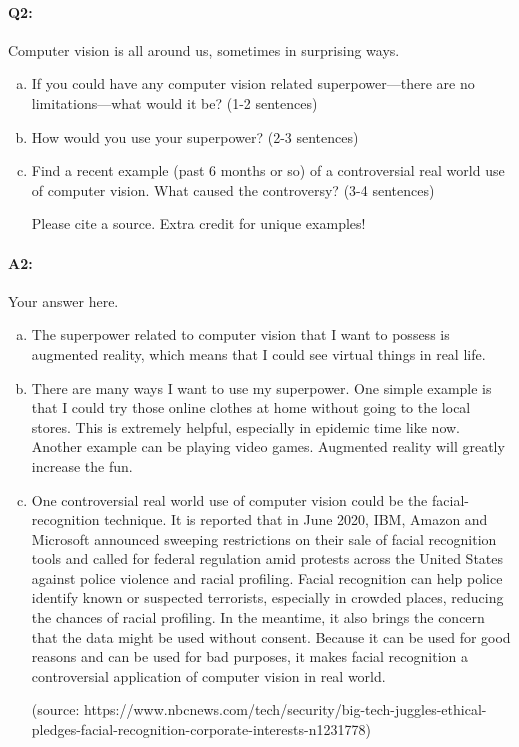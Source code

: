 \documentclass[11pt]{article}
\begin{document}
\paragraph{Q2:}
Computer vision is all around us, sometimes in surprising ways.
\begin{enumerate}[(a)]

\item
If you could have any computer vision related superpower---there are no limitations---what would it be? (1-2 sentences)

\item
How would you use your superpower? (2-3 sentences)

\item Find a recent example (past 6 months or so) of a controversial real world use of computer vision. What caused the controversy? (3-4 sentences)

Please cite a source. Extra credit for unique examples!
\end{enumerate}

\paragraph{A2:} Your answer here.

\begin{enumerate}[(a)]

\item The superpower related to computer vision that I want to possess is augmented reality, which means that I could see virtual things in real life.

\item There are many ways I want to use my superpower. One simple example is that I could try those online clothes at home without going to the local stores. This is extremely helpful, especially in epidemic time like now. Another example can be playing video games. Augmented reality will greatly increase the fun.

\item One controversial real world use of computer vision could be the facial-recognition technique. It is reported that in June 2020, IBM, Amazon and Microsoft announced sweeping restrictions on their sale of facial recognition tools and called for federal regulation amid protests across the United States against police violence and racial profiling. Facial recognition can help police identify known or suspected terrorists, especially in crowded places, reducing the chances of racial profiling. In the meantime, it also brings the concern that the data might be used without consent. Because it can be used for good reasons and can be used for bad purposes, it makes facial recognition a controversial application of computer vision in real world.

(source: https://www.nbcnews.com/tech/security/big-tech-juggles-ethical-pledges-facial-recognition-corporate-interests-n1231778)

\end{enumerate}
\end{document}
